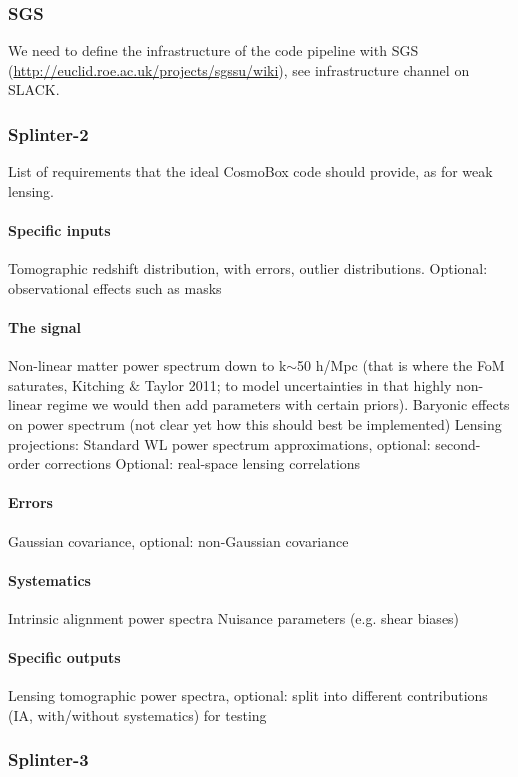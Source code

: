 \subsubsection{SGS}
We need to define the infrastructure of the code pipeline with SGS (\url{http://euclid.roe.ac.uk/projects/sgssu/wiki}), see infrastructure channel on SLACK.


\subsubsection{Splinter-2}
List of requirements that the ideal CosmoBox code should provide, as for weak lensing.

\paragraph{Specific inputs}
Tomographic redshift distribution, with errors, outlier distributions.
Optional: observational effects such as masks
\paragraph{The signal}
Non-linear matter power spectrum down to k$\sim$50 h/Mpc (that is where the FoM saturates, Kitching $\&$ Taylor 2011; to model uncertainties in that highly non-linear regime we would then add parameters with certain priors).
Baryonic effects on power spectrum (not clear yet how this should best be implemented) 
Lensing projections: Standard WL power spectrum approximations, optional: second-order corrections
Optional: real-space lensing correlations
\paragraph{Errors}
Gaussian covariance, optional: non-Gaussian covariance
\paragraph{Systematics}
Intrinsic alignment power spectra
Nuisance parameters (e.g. shear biases)

\paragraph{Specific outputs}
Lensing tomographic power spectra, optional: split into different contributions (IA, with/without systematics) for testing


\subsubsection{Splinter-3}

